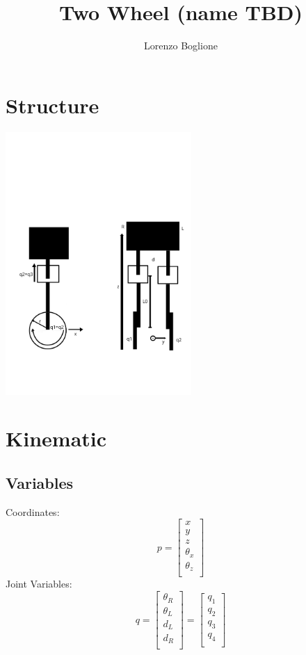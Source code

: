 \documentclass[a4paper, 7px]{article}
\title{Two Wheel (name TBD)}
\author{Lorenzo Boglione}
\begin{document}
\maketitle
\newpage


\section{Structure}
\includegraphics[height=100mm]{Schematic_png}
\section{Kinematic}

\subsection{Variables}
Coordinates:
$$p = 
\begin{bmatrix}
	x\\ 
	y\\
	z\\ 
	\theta_x\\
	\theta_z\\ 
	
\end{bmatrix}
$$
Joint Variables:
$$q = 
\begin{bmatrix}
	\theta_R\\
	\theta_L\\
	d_L\\
	d_R\\
\end{bmatrix} =  
\begin{bmatrix}
	q_1\\ 
	q_2\\ 
	q_3\\
	q_4\\
\end{bmatrix}$$
\end{document}
